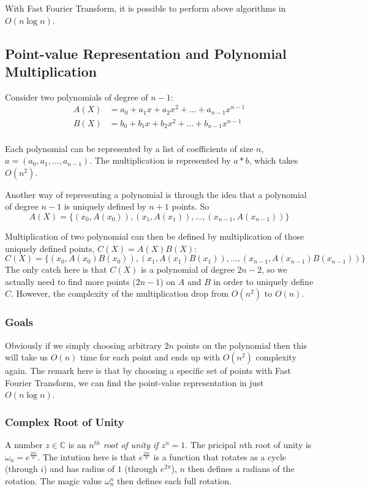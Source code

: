 \documentclass[10pt]{article}
\begin{document}
With Fast Fourier Transform, it is possible to perform above
algorithms in $O(n\log n)$.

\subsection{Point-value Representation and Polynomial Multiplication}
Consider two polynomials of degree of $n-1$:
\[
\begin{aligned}
    A(X) &= a_0 + a_1x + a_2x^2 + \ldots + a_{n-1}x^{n-1} \\
    B(X) &= b_0 + b_1x + b_2x^2 + \ldots + b_{n-1}x^{n-1} \\
\end{aligned}
\]

Each polynomial can be represented by a list of coefficients of size $n$, $a =
(a_0, a_1, \ldots, a_{n-1})$. The multiplication is represented by $a
* b$, which takes $O(n^2)$.

Another way of representing a polynomial is through the idea that a polynomial
of degree $n-1$ is uniquely defined by $n+1$ points. So
\[
    A(X) = \{(x_0, A(x_0)), (x_1, A(x_1)), \ldots, (x_{n-1}, A(x_{n-1}))\}
\]

Multiplication of two polynomial can then be defined by multiplication of those
uniquely defined points, $C(X) = A(X)B(X)$:
\[
    C(X) = \{(x_0, A(x_0)B(x_0)), (x_1, A(x_1)B(x_1)), \ldots, (x_{n-1}, A(x_{n-1})B(x_{n-1}))\}
\]
The only catch here is that $C(X)$ is a polynomial of degree $2n-2$, so we
actually need to find more points ($2n-1$) on $A$ and $B$ in order to uniquely define $C$.
However, the complexity of the multiplication drop from $O(n^2)$ to $O(n)$.

\subsubsection{Goals}
Obviously if we simply choosing arbitrary $2n$ points on the polynomial then
this will take us $O(n)$ time for each point and ends up with $O(n^2)$
complexity again. The remark here is that by choosing a specific set of points
with Fast Fourier Transform, we can find the point-value representation in
just $O(n\log n)$.

\subsubsection{Complex Root of Unity}
A number $z \in \mathbb{C}$ is an \emph{$n^{th}$ root of unity if $z^n = 1$}.
The pricipal $n$th root of unity is $\omega_n = e^{\frac{2\pi i}{n}}$.
The intution here is that $e^{\frac{2\pi i}{n}}$ is a function that rotates
as a cycle (through $i$) and has radius of $1$ (through $e^{2\pi}$), $n$ then
defines a radians of the rotation. The magic value $\omega_n^n$ then defines
each full rotation.
\end{document}
